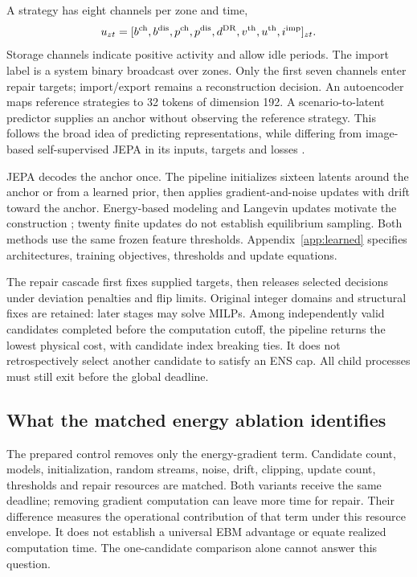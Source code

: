 A strategy has eight channels per zone and time,
\begin{equation}
 u_{zt}=[b^{\rm ch},b^{\rm dis},p^{\rm ch},p^{\rm dis},d^{\rm DR},v^{\rm th},u^{\rm th},i^{\rm imp}]_{zt}.
 \label{eq:strategy}
\end{equation}
Storage channels indicate positive activity and allow idle periods. The import
label is a system binary broadcast over zones. Only the first seven channels
enter repair targets; import/export remains a reconstruction decision.
An autoencoder maps reference strategies to 32 tokens of dimension 192.
A scenario-to-latent predictor supplies an anchor without observing the
reference strategy. This follows the broad idea of predicting representations,
while differing from image-based self-supervised JEPA in its inputs, targets
and losses \citep{assran2023}.

JEPA decodes the anchor once. The pipeline initializes sixteen latents around
the anchor or from a learned prior, then applies gradient-and-noise updates
with drift toward the anchor. Energy-based modeling and Langevin updates
motivate the construction \citep{du2019,welling2011}; twenty finite updates do
not establish equilibrium sampling. Both methods use the same frozen feature
thresholds. Appendix~\ref{app:learned} specifies architectures, training
objectives, thresholds and update equations.



The repair cascade first fixes supplied targets, then releases selected
decisions under deviation penalties and flip limits. Original integer domains
and structural fixes are retained: later stages may solve MILPs. Among
independently valid candidates completed before the computation cutoff, the
pipeline returns the lowest physical cost, with candidate index breaking ties.
It does not retrospectively select another candidate to satisfy an ENS cap.
All child processes must still exit before the global deadline.

\subsection{What the matched energy ablation identifies}
The prepared control removes only the energy-gradient term. Candidate count,
models, initialization, random streams, noise, drift, clipping, update count,
thresholds and repair resources are matched. Both variants receive the same
deadline; removing gradient computation can leave more time for repair.
Their difference measures the operational contribution of that term under
this resource envelope. It does not establish a universal EBM advantage or
equate realized computation time. The one-candidate comparison alone cannot
answer this question.

